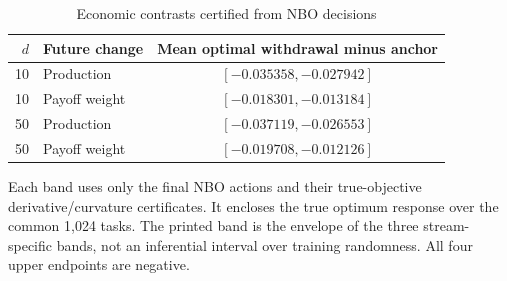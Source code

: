 \begin{table}[htbp]\centering\small
\caption{Economic contrasts certified from NBO decisions}\label{tab:r21nbocontrasts}
\begin{tabular}{rlc}\toprule
$d$ & Future change & Mean optimal withdrawal minus anchor\\ \midrule
10 & Production & $[-0.035358,-0.027942]$\\
10 & Payoff weight & $[-0.018301,-0.013184]$\\
50 & Production & $[-0.037119,-0.026553]$\\
50 & Payoff weight & $[-0.019708,-0.012126]$\\
\bottomrule\end{tabular}
\par\smallskip\begin{minipage}{.98\textwidth}\footnotesize Each band uses only the final NBO actions and their true-objective derivative/curvature certificates. It encloses the true optimum response over the common 1,024 tasks. The printed band is the envelope of the three stream-specific bands, not an inferential interval over training randomness. All four upper endpoints are negative.\end{minipage}
\end{table}
